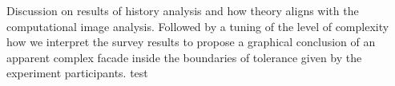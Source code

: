 
Discussion on results of history analysis and how theory aligns with the computational image analysis.
Followed by a tuning of the level of complexity how we interpret the survey results to propose a graphical conclusion of an apparent complex facade inside the boundaries of tolerance given by the experiment participants.
test